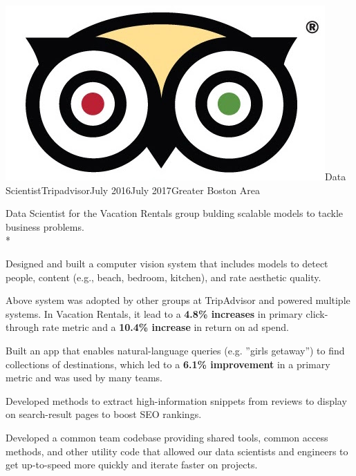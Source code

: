\documentclass[print]{friggeri-cv} %
\newcommand{\tripicon}{\includegraphics[scale=0.05]{trip_logo.jpg}}%
\begin{document}
\begin{job}
  {\tripicon}{Data Scientist}{Tripadvisor}{July 2016}{July 2017}{Greater Boston Area}{
    Data Scientist for the Vacation Rentals group bulding scalable models to tackle business problems.\\*
    \begin{myitemize}
      \item Designed and built a computer vision system that includes models to
      detect people, content (e.g., beach, bedroom, kitchen), and rate aesthetic
      quality.

      \item Above system was adopted by other groups at TripAdvisor and powered multiple
      systems. In Vacation Rentals, it lead to a \textbf{4.8\% increases} in primary
      click-through rate metric and a \textbf{10.4\% increase} in return on ad spend.

      \item Built an app that enables natural-language queries (e.g. ”girls getaway”)
      to find collections of destinations, which led to a \textbf{6.1\% improvement} in a
      primary metric and was used by many teams. 

      \item Developed methods to extract high-information snippets from reviews
      to display on search-result pages to boost SEO rankings.

      \item Developed a common team codebase providing shared tools, common
      access methods, and other utility code that allowed our data scientists
      and engineers to get up-to-speed more quickly and iterate faster on
      projects.
    \end{myitemize}
  }
  \end{job}
\end{document}
